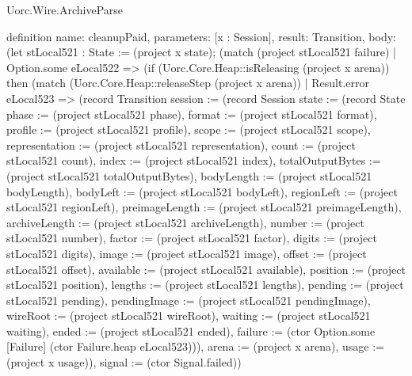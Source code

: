 \begin{lexlean}{Uorc.Wire.ArchiveParse}
\begin{semanticmodule}
definition{
  name: cleanupPaid,
  parameters: [x : Session],
  result: Transition,
  body: (let stLocal521 : State := (project x state); (match (project stLocal521 failure)
    | Option.some eLocal522 => (if (Uorc.Core.Heap::isReleasing (project x arena)) then (match (Uorc.Core.Heap::releaseStep (project x arena))
      | Result.error eLocal523 => (record Transition {session := (record Session {state := (record State {phase := (project stLocal521 phase), format := (project stLocal521 format), profile := (project stLocal521 profile), scope := (project stLocal521 scope), representation := (project stLocal521 representation), count := (project stLocal521 count), index := (project stLocal521 index), totalOutputBytes := (project stLocal521 totalOutputBytes), bodyLength := (project stLocal521 bodyLength), bodyLeft := (project stLocal521 bodyLeft), regionLeft := (project stLocal521 regionLeft), preimageLength := (project stLocal521 preimageLength), archiveLength := (project stLocal521 archiveLength), number := (project stLocal521 number), factor := (project stLocal521 factor), digits := (project stLocal521 digits), image := (project stLocal521 image), offset := (project stLocal521 offset), available := (project stLocal521 available), position := (project stLocal521 position), lengths := (project stLocal521 lengths), pending := (project stLocal521 pending), pendingImage := (project stLocal521 pendingImage), wireRoot := (project stLocal521 wireRoot), waiting := (project stLocal521 waiting), ended := (project stLocal521 ended), failure := (ctor Option.some [Failure] (ctor Failure.heap eLocal523))}), arena := (project x arena), usage := (project x usage)}), signal := (ctor Signal.failed)})
}
\end{semanticmodule}
\end{lexlean}
